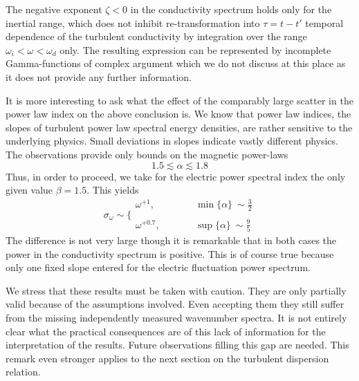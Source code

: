 \documentclass[ ]{copernicus2}
\begin{document}
{{{{The negative exponent $\zeta<0$ in the conductivity spectrum holds only for the inertial range, which does not inhibit re-transformation into $\tau=t-t'$ temporal dependence of the turbulent conductivity by integration over the range $\omega_i<\omega<\omega_d$ only. The resulting expression can be represented by incomplete Gamma-functions of complex argument which we do not discuss at this place as it does not provide any further information.}

{It is more interesting to ask what the effect of the comparably large scatter in the power law index on the above conclusion is. We know that power law indices, the slopes of turbulent power law spectral energy densities, are rather sensitive to the underlying physics. Small deviations in slopes indicate vastly different physics. The observations provide only bounds on the magnetic power-laws 
\begin{equation}
1.5\lesssim \alpha \lesssim1.8
\end{equation}
Thus, in order to proceed, we take for the electric power spectral index the only given value $\beta=1.5$. This yields 
\begin{equation}
\sigma_\omega\sim \bigg\{
\begin{array}{ccc}
 \omega^{+1}, & \quad\quad   &  \min\{\alpha\}\ \sim \frac{3}{2} \\[-1ex]
  &   &   \\[-1ex]
 \omega^{+0.7}, & \quad\quad  &  \sup\{\alpha\}\ \sim \frac{9}{5}
\end{array}
\end{equation}
The difference is not very large though it is remarkable that in both cases the power in the conductivity spectrum is positive. This is of course true because only one fixed slope entered for the electric fluctuation power spectrum.}

{We stress that these results must be taken with caution. They are only partially valid because of the assumptions involved. Even accepting them they still suffer from the missing independently measured wavenumber spectra. It is not entirely clear what the practical consequences are of this lack of information for the interpretation of the results. Future observations filling this gap are needed. This remark even stronger applies to the next section on the turbulent dispersion relation.}



}}}
\end{document}

